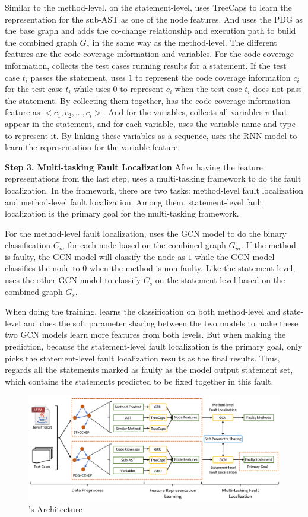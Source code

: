 Similar to the method-level, on the statement-level, \tool uses TreeCaps to learn the representation for the sub-AST as one of the node features. And \tool uses the PDG as the base graph and adds the co-change relationship and execution path to build the combined graph $G_s$ in the same way as the method-level. The different features are the code coverage information and variables. For the code coverage information, \tool collects the test cases running results for a statement. If the test case $t_i$ passes the statement, \tool uses $1$ to represent the code coverage information $c_i$ for the test case $t_i$ while \tool uses $0$ to represent $c_i$ when the test case $t_i$ does not pass the statement. By collecting them together, \tool has the code coverage information feature as $<c_1, c_2, ..., c_i>$. And for the variables, \tool collects all variables $v$ that appear in the statement, and for each variable, \tool uses the variable name and type to represent it. By linking these variables as a sequence, \tool uses the RNN model to learn the representation for the variable feature.

{\bf Step 3. Multi-tasking Fault Localization} After having the feature representations from the last step, \tool uses a multi-tasking framework to do the fault localization. In the framework, there are two tasks: method-level fault localization and method-level fault localization. Among them, statement-level fault localization is the primary goal for the multi-tasking framework.

For the method-level fault localization, \tool uses the GCN model \cite{} to do the binary classification $C_m$ for each node based on the combined graph $G_m$. If the method is faulty, the GCN model will classify the node as $1$ while the GCN model classifies the node to $0$ when the method is non-faulty. Like the statement level, \tool uses the other GCN model to classify $C_s$ on the statement level based on the combined graph $G_s$.

When doing the training, \tool learns the classification on both method-level and state-level and does the soft parameter sharing between the two models to make these two GCN models learn more features from both levels. But when making the prediction, because the statement-level fault localization is the primary goal, \tool only picks the statement-level fault localization results as the final results. Thus, \tool regards all the statements marked as faulty as the model output statement set, which contains the statements predicted to be fixed together in this fault.

\begin{figure}[t]
	\centering
	\includegraphics[width=6.5in]{graphs/overview.png}
	\caption{{\tool}'s Architecture}
	\label{overview}
\end{figure}



